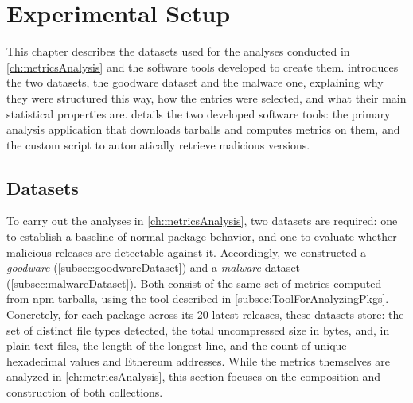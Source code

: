 \chapter{Experimental Setup}
\label{ch:ExperimentalSetup}

This chapter describes the datasets used for the analyses conducted in \cref{ch:metricsAnalysis} and the software tools developed to create them.
 introduces the two datasets, the goodware dataset and the malware one, 
explaining why they were structured this way, 
how the entries were selected, and what their main statistical properties are.
 details the two developed software tools:
the primary analysis application that downloads tarballs and computes metrics on them,
and the custom script to automatically retrieve malicious versions.

\section{Datasets}
\label{sec:datasets}

To carry out the analyses in \cref{ch:metricsAnalysis}, two datasets are required:
one to establish a baseline of normal package behavior, 
and one to evaluate whether malicious releases are detectable against it.
Accordingly, we constructed a \emph{goodware} (\cref{subsec:goodwareDataset}) and a \emph{malware} dataset (\cref{subsec:malwareDataset}).
Both consist of the same set of metrics computed from \ac{npm} tarballs,
using the tool described in \cref{subsec:ToolForAnalyzingPkgs}.
Concretely, for each package across its 20 latest releases, these datasets store:
the set of distinct file types detected, 
the total uncompressed size in bytes, 
and, in plain-text files, the length of the longest line, 
and the count of unique hexadecimal values and Ethereum addresses.
While the metrics themselves are analyzed in \cref{ch:metricsAnalysis},
this section focuses on the composition and construction of both collections.

